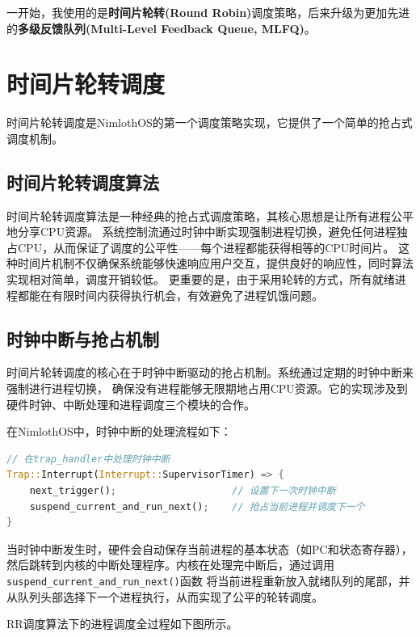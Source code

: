 一开始，我使用的是\textbf{时间片轮转(Round Robin)}调度策略，后来升级为更加先进的\textbf{多级反馈队列(Multi-Level Feedback Queue, MLFQ)}。

\section{时间片轮转调度}

时间片轮转调度是NimlothOS的第一个调度策略实现，它提供了一个简单的抢占式调度机制。

\subsection{时间片轮转调度算法}

时间片轮转调度算法是一种经典的抢占式调度策略，其核心思想是让所有进程公平地分享CPU资源。
系统控制流通过时钟中断实现强制进程切换，避免任何进程独占CPU，从而保证了调度的公平性——每个进程都能获得相等的CPU时间片。
这种时间片机制不仅确保系统能够快速响应用户交互，提供良好的响应性，同时算法实现相对简单，调度开销较低。
更重要的是，由于采用轮转的方式，所有就绪进程都能在有限时间内获得执行机会，有效避免了进程饥饿问题。

\subsection{时钟中断与抢占机制}

时间片轮转调度的核心在于时钟中断驱动的抢占机制。系统通过定期的时钟中断来强制进行进程切换，
确保没有进程能够无限期地占用CPU资源。它的实现涉及到硬件时钟、中断处理和进程调度三个模块的合作。

在NimlothOS中，时钟中断的处理流程如下：

\begin{lstlisting}[language=Rust,caption={时钟中断处理}, label={lst:timer-interrupt}]
// 在trap_handler中处理时钟中断
Trap::Interrupt(Interrupt::SupervisorTimer) => {
    next_trigger();                    // 设置下一次时钟中断
    suspend_current_and_run_next();    // 抢占当前进程并调度下一个
}
\end{lstlisting}

当时钟中断发生时，硬件会自动保存当前进程的基本状态（如PC和状态寄存器），
然后跳转到内核的中断处理程序。内核在处理完中断后，通过调用\lstinline[language=Rust]{suspend_current_and_run_next()}函数
将当前进程重新放入就绪队列的尾部，并从队列头部选择下一个进程执行，从而实现了公平的轮转调度。

RR调度算法下的进程调度全过程如下图所示。

